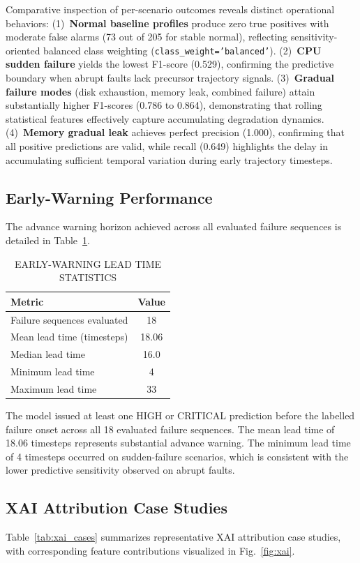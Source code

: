 \documentclass[conference]{IEEEtran}
\begin{document}
Comparative inspection of per-scenario outcomes reveals distinct operational behaviors: (1)~\textbf{Normal baseline profiles} produce zero true positives with moderate false alarms (73 out of 205 for stable normal), reflecting sensitivity-oriented balanced class weighting (\texttt{class\_weight='balanced'}). (2)~\textbf{CPU sudden failure} yields the lowest F1-score (0.529), confirming the predictive boundary when abrupt faults lack precursor trajectory signals. (3)~\textbf{Gradual failure modes} (disk exhaustion, memory leak, combined failure) attain substantially higher F1-scores (0.786 to 0.864), demonstrating that rolling statistical features effectively capture accumulating degradation dynamics. (4)~\textbf{Memory gradual leak} achieves perfect precision (1.000), confirming that all positive predictions are valid, while recall (0.649) highlights the delay in accumulating sufficient temporal variation during early trajectory timesteps.

\subsection{Early-Warning Performance}
The advance warning horizon achieved across all evaluated failure sequences is detailed in Table~\ref{tab:early_warning}.

\begin{table}[htbp]
\centering
\caption{EARLY-WARNING LEAD TIME STATISTICS}
\label{tab:early_warning}
\begin{tabular}{lc}
\toprule
\textbf{Metric} & \textbf{Value} \\
\midrule
Failure sequences evaluated & 18 \\
Mean lead time (timesteps) & 18.06 \\
Median lead time & 16.0 \\
Minimum lead time & 4 \\
Maximum lead time & 33 \\
\bottomrule
\end{tabular}
\end{table}

The model issued at least one HIGH or CRITICAL prediction before the labelled failure onset across all 18 evaluated failure sequences. The mean lead time of 18.06 timesteps represents substantial advance warning. The minimum lead time of 4 timesteps occurred on sudden-failure scenarios, which is consistent with the lower predictive sensitivity observed on abrupt faults.

\subsection{XAI Attribution Case Studies}
Table~\ref{tab:xai_cases} summarizes representative XAI attribution case studies, with corresponding feature contributions visualized in Fig.~\ref{fig:xai}.
\end{document}

